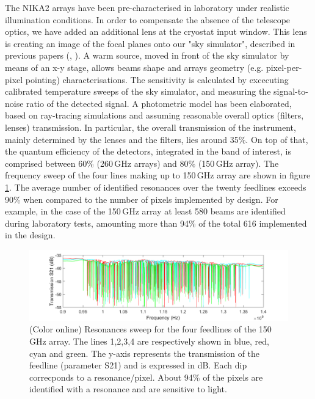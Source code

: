 \documentclass[]{aa} %
\begin{document}
The NIKA2 arrays have been pre-characterised in laboratory under realistic illumination conditions. In order to compensate the absence of the telescope optics, we have added an additional lens at the cryostat input window. This lens is creating an image of the focal planes onto our "sky simulator", described in previous papers (\cite{Catalano2014}, \cite{Monfardini2011}). A warm source, moved in front of the sky simulator by means of an x-y stage, allows beams shape and arrays geometry (e.g. pixel-per-pixel pointing) characterisations. The sensitivity is calculated by excecuting calibrated temperature sweeps of the sky simulator, and measuring the signal-to-noise ratio of the detected signal. A photometric model has been elaborated, based on ray-tracing simulations and assuming reasonable overall optics (filters, lenses) transmission. In particular, the overall transmission of the instrument, mainly determined by the lenses and the filters, lies around 35\%. On top of that, the quantum efficiency of the detectors, integrated in the band of interest, is comprised between 60\% (260\,GHz arrays) and 80\% (150\,GHz array). The frequency sweep of the four lines making up to 150\,GHz array are shown in figure \ref{VNA}. The average number of identified resonances over the twenty feedlines exceeds 90\% when compared to the number of pixels implemented by design. For example, in the case of the 150\,GHz array at least 580 beams are identified during laboratory tests, amounting more than 94\% of the total 616 implemented in the design. 

\begin{figure}[h]
\begin{center}
   \centering
    \includegraphics[width=1.05\linewidth]{VNA_scans_150GHz.png}
    \caption{(Color online) Resonances sweep for the four feedlines of the 150\,GHz array. The lines 1,2,3,4 are respectively shown in blue, red, cyan and green. The y-axis represents the transmission of the feedline (parameter S21) and is expressed in dB. Each dip correcponds to a resonance/pixel. About 94\% of the pixels are identified with a resonance and are sensitive to light.}
         \label{VNA}
\end{center}
\end{figure}
\end{document}
